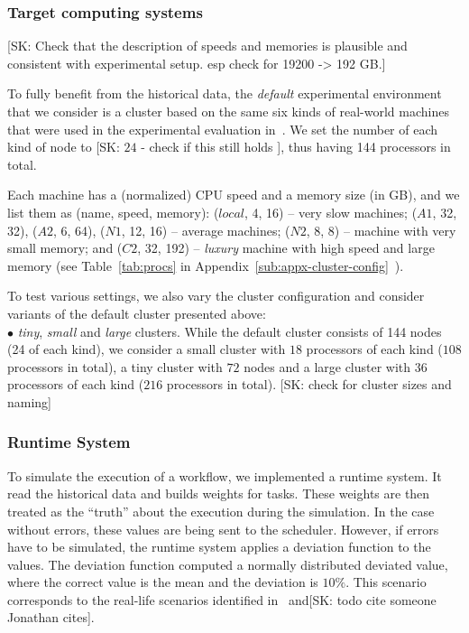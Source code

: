 \documentclass[conference]{IEEEtran}
\newcommand{\skug}[1]{{\color{blue}[SK: #1]}}
\begin{document}
    \subsubsection{Target computing systems}
    \skug{Check that the description of speeds and memories is plausible and consistent with experimental setup. esp check for 19200 -> 192 GB.}

    To fully benefit from the historical data, the  {\em default} experimental environment
    that we consider is a cluster based on the same six
    kinds of real-world machines that were used in the experimental evaluation in~\cite{lotaru}.
    We set the number of each kind of node to \skug{$24$ - check if this still holds }, thus having 144 processors in total. %

    Each machine has a (normalized) CPU speed and a memory size (in GB), and we list them as (name, speed, memory):
    ($local$, 4, 16) -- very slow machines; ($A1$, 32, 32), ($A2$, 6, 64), ($N1$, 12, 16) -- average machines; ($N2$, 8, 8) -- machine with very small memory; and ($C2$, 32, 192) -- {\em luxury} machine with high speed and large memory
    (see Table~\ref{tab:procs} in Appendix~\ref{sub:appx-cluster-config}~\cite{daghetpart_full_version}).

    To test various settings, we also vary the cluster configuration and consider
    variants of the default cluster presented above:\\
    $\bullet$ {\em tiny}, {\em small} and {\em large} clusters. While the default cluster consists of 144 nodes (24 of each kind), we
    consider a small cluster with $18$ processors of each kind ($108$ processors in total), a tiny cluster with $72$ nodes and a
    large cluster with $36$ processors of each kind ($216$ processors in total). \skug{check for cluster sizes and naming}\\

    \subsubsection{Runtime System}

    To simulate the execution of a workflow, we implemented a runtime system.
    It read the historical data and builds weights for tasks.
    These weights are then treated as the ``truth'' about the execution during the simulation.
    In the case without errors, these values are being sent to the scheduler.
    However, if errors have to be simulated, the runtime system applies a deviation function to the values.
    The deviation function computed a normally distributed deviated value, where the correct value is the mean and the deviation
    is $10\%$.
    This scenario corresponds to the real-life scenarios identified in~\cite{lotaru} and\skug{todo cite someone Jonathan cites}.
\end{document}
